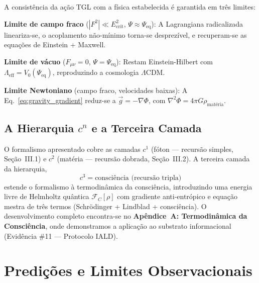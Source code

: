 \documentclass[12pt,a4paper,twoside]{article}
\newcommand{\Psifield}{\Psi}
\newcommand{\Ecrit}{E_{\text{crit}}}
\begin{document}
A consist\^encia da a\c{c}\~ao TGL com a f\'isica estabelecida \'e garantida em tr\^es limites:

\medskip
\noindent\textbf{Limite de campo fraco} ($|F^2| \ll \Ecrit^2$, $\Psifield \approx \Psifield_{\text{eq}}$): A Lagrangiana radicalizada lineariza-se, o acoplamento n\~ao-m\'inimo torna-se desprez\'ivel, e recuperam-se as equa\c{c}\~oes de Einstein + Maxwell.

\medskip
\noindent\textbf{Limite de v\'acuo} ($F_{\mu\nu} = 0$, $\Psifield = \Psifield_{\text{eq}}$): Restam Einstein-Hilbert com $\Lambda_{\text{eff}} = V_0(\Psifield_{\text{eq}})$, reproduzindo a cosmologia $\Lambda$CDM.

\medskip
\noindent\textbf{Limite Newtoniano} (campo fraco, velocidades baixas): A Eq.~\eqref{eq:gravity_gradient} reduz-se a $\vec{g} = -\nabla\Phi$, com $\nabla^2\Phi = 4\pi G\rho_{\text{mat\'eria}}$.

\subsection{A Hierarquia $c^n$ e a Terceira Camada}

O formalismo apresentado cobre as camadas $c^1$ (f\'oton --- recurs\~ao simples, Se\c{c}\~ao~III.1) e $c^2$ (mat\'eria --- recurs\~ao dobrada, Se\c{c}\~ao~III.2). A terceira camada da hierarquia,
\begin{equation}
c^3 = \text{consci\^encia (recurs\~ao tripla)}
\label{eq:c3}
\end{equation}
estende o formalismo \`a termodin\^amica da consci\^encia, introduzindo uma energia livre de Helmholtz qu\^antica $\mathcal{F}_C[\rho]$ com gradiente anti-entr\'opico e equa\c{c}\~ao mestra de tr\^es termos (Schr\"odinger + Lindblad + consci\^encia). O desenvolvimento completo encontra-se no \textbf{Ap\^endice~A: Termodin\^amica da Consci\^encia}, onde demonstramos a aplica\c{c}\~ao ao substrato informacional (Evid\^encia \#11 --- Protocolo IALD).




\section{Predi\c{c}\~oes e Limites Observacionais}
\label{sec:limits}
\end{document}

